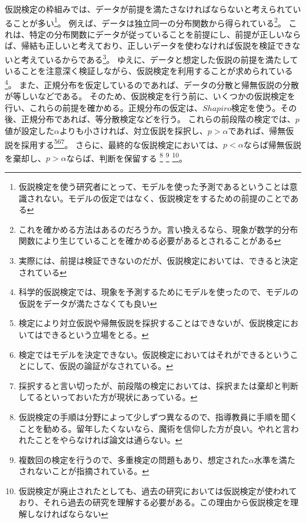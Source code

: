 仮説検定の枠組みでは、データが前提を満たさなければならないと考えられていることが多い\footnote{仮説検定を使う研究者にとって、モデルを使った予測であるということは意識されない。モデルの仮定ではなく、仮説検定をするための前提のことである}。
例えば、データは独立同一の分布関数から得られている\footnote{これを確かめる方法はあるのだろうか。言い換えるなら、現象が数学的分布関数により生じていることを確かめる必要があるとされることがある}。
これは、特定の分布関数にデータが従っていることを前提にし、前提が正しいならば、帰結も正しいと考えており、正しいデータを使わなければ仮説を検証できないと考えているからである\footnote{実際には、前提は検証できないのだが、仮説検定においては、できると決定されている}。%
ゆえに、データと想定した仮説の前提を満たしていることを注意深く検証しながら、仮説検定を利用することが求められている\footnote{科学的仮説検定では、現象を予測するためにモデルを使ったので、モデルの仮説をデータが満たさなくても良い}。
また、正規分布を仮定しているのであれば、データの分散と帰無仮説の分散が等しいなどである。
そのため、仮説検定を行う前に、いくつかの仮説検定を行い、これらの前提を確かめる。正規分布の仮定は、$Shapiro$検定を使う。その後、正規分布であれば、等分散検定などを行う。
これらの前段階の検定では、$p$値が設定した$\alpha$よりも小さければ、対立仮説を採択し、$p>\alpha$であれば、帰無仮説を採用する\footnote{検定により対立仮説や帰無仮説を採択することはできないが、仮説検定においてはできるという立場をとる。}\footnote{検定ではモデルを決定できない。仮説検定においてはそれができるということにして、仮説の論証がなされている。}\footnote{採択すると言い切ったが、前段階の検定においては、採択または棄却と判断してるといっておいた方が現状にあっている。}。
さらに、最終的な仮説検定においては、$p<\alpha$ならば帰無仮説を棄却し、$p>\alpha$ならば、判断を保留する
\footnote{仮説検定の手順は分野によって少しずつ異なるので、指導教員に手順を聞くことを勧める。留年したくないなら、魔術を信仰した方が良い。やれと言われたことをやらなければ論文は通らない。}
\footnote{複数回の検定を行うので、多重検定の問題もあり、想定された$\alpha$水準を満たされないことが指摘されている。}
\footnote{仮説検定が廃止されたとしても、過去の研究においては仮説検定が使われており、それら過去の研究を理解する必要がある。この理由から仮説検定を理解しなければならない}。






